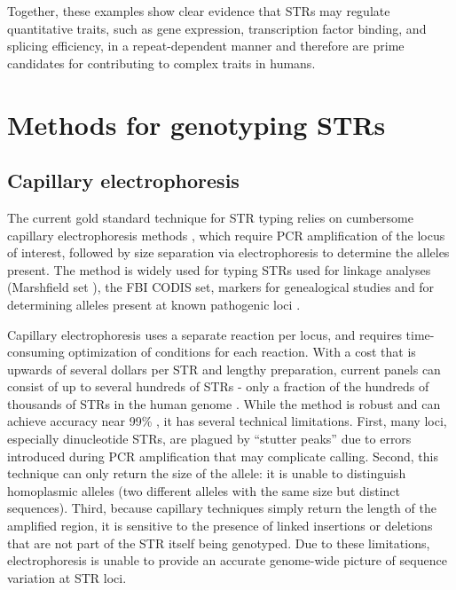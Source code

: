 Together, these examples show clear evidence that STRs may regulate quantitative traits, such as gene expression, transcription factor binding, and splicing efficiency, in a repeat-dependent manner and therefore are prime candidates for contributing to complex traits in humans.

\section{Methods for genotyping STRs}
\label{sec:intromethods}
\subsection{Capillary electrophoresis}
The current gold standard technique for STR typing relies on cumbersome capillary electrophoresis methods \cite{ButlerBuelCrivellenteEtAl2004}, which require PCR amplification of the locus of interest, followed by size separation via electrophoresis to determine the alleles present. The method is widely used for typing STRs used for linkage analyses (Marshfield set \cite{BromanMurraySheffieldEtAl1998}), the FBI CODIS set, markers for genealogical studies \cite{ZerjalXueBertorelleEtAl2003,SkoreckiSeligBlazerEtAl1997} and for determining alleles present at known pathogenic loci \cite{LyonLaverYuEtAl2010,BlancoSuarezGandia-PlaEtAl2008}.

Capillary electrophoresis uses a separate reaction per locus, and requires time-consuming optimization of conditions for each reaction. With a cost that is upwards of several dollars per STR and lengthy preparation, current panels can consist of up to several hundreds of STRs - only a fraction of the hundreds of thousands of STRs in the human genome \cite{Benson1999}. While the method is robust and can achieve accuracy near 99\% \cite{WeberBroman2001}, it has several technical limitations. First, many loci, especially dinucleotide STRs, are plagued by ``stutter peaks'' due to errors introduced during PCR amplification that may complicate calling. Second, this technique can only return the size of the allele: it is unable to distinguish homoplasmic alleles \cite{WeberBroman2001} (two different alleles with the same size but distinct sequences). Third, because capillary techniques simply return the length of the amplified region, it is sensitive to the presence of linked insertions or deletions that are not part of the STR itself being genotyped. Due to these limitations, electrophoresis is unable to provide an accurate genome-wide picture of sequence variation at STR loci.

